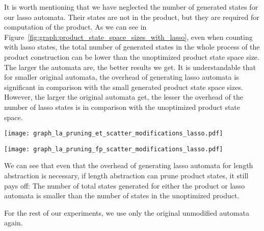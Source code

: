 It is worth mentioning that we have neglected the number of generated states for our lasso automata. Their states are not in the product, but they are required for computation of the product. As we can see in Figure~\ref{fig:graph:product_state_space_sizes_with_lasso}, even when counting with lasso states, the total number of generated states in the whole process of the product construction can be lower than the unoptimized product state space size. The larger the automata are, the better results we get. It is understandable that for smaller original automata, the overhead of generating lasso automata is significant in comparison with the small generated product state space sizes. However, the larger the original automata get, the lesser the overhead of the number of lasso states is in comparison with the unoptimized product state space.

\begin{figure*}[ht]
    \centering
    \begin{minipage}{0.49\linewidth}
        \centering
        \texttt{[image: graph\_la\_pruning\_et\_scatter\_modifications\_lasso.pdf]}
        \caption{Emptiness problem.}
        \label{fig:graph:et_state_space_sizes_comp_with_lasso}
    \end{minipage}
    \hfill
    \begin{minipage}{0.49\linewidth}
        \centering
        \texttt{[image: graph\_la\_pruning\_fp\_scatter\_modifications\_lasso.pdf]}
        \caption{Product construction.}
        \label{fig:graph:fp_state_space_sizes_comp_with_lasso}
    \end{minipage}
    \vspace{0.5cm}
    \caption{Comparison of state space sizes in unoptimized product and product optimized by length abstraction with a sum of states generated for both lasso automata. Both axes are in symmetrical logarithmic scale, x-axis showing the number of states in the unoptimized product, y-axis the number of states in the optimized product.}
    \label{fig:graph:product_state_space_sizes_with_lasso}
\end{figure*}

We can see that even that the overhead of generating lasso automata for length abstraction is necessary, if length abstraction can prune product states, it still pays off: The number of total states generated for either the product or lasso automata is smaller than the number of states in the unoptimized product.

For the rest of our experiments, we use only the original unmodified automata again.


